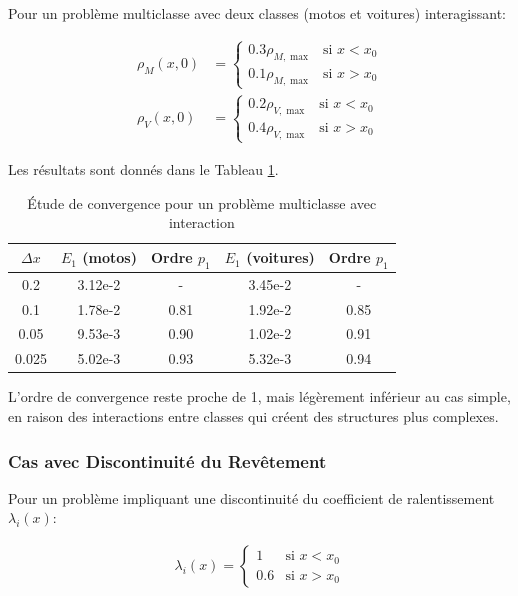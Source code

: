 Pour un problème multiclasse avec deux classes (motos et voitures) interagissant:

\begin{align}
\rho_M(x,0) &= 
\begin{cases}
0.3\rho_{M,\max} & \text{si } x < x_0\\
0.1\rho_{M,\max} & \text{si } x > x_0
\end{cases}\\
\rho_V(x,0) &= 
\begin{cases}
0.2\rho_{V,\max} & \text{si } x < x_0\\
0.4\rho_{V,\max} & \text{si } x > x_0
\end{cases}
\end{align}

Les résultats sont donnés dans le Tableau \ref{tab:conv_multiclasse}.

\begin{table}[htbp]
\centering
\caption{Étude de convergence pour un problème multiclasse avec interaction}
\label{tab:conv_multiclasse}
\begin{tabular}{ccccc}
\toprule
$\Delta x$ & $E_1$ (motos) & Ordre $p_1$ & $E_1$ (voitures) & Ordre $p_1$ \\
\midrule
0.2 & 3.12e-2 & - & 3.45e-2 & - \\
0.1 & 1.78e-2 & 0.81 & 1.92e-2 & 0.85 \\
0.05 & 9.53e-3 & 0.90 & 1.02e-2 & 0.91 \\
0.025 & 5.02e-3 & 0.93 & 5.32e-3 & 0.94 \\
\bottomrule
\end{tabular}
\end{table}

L'ordre de convergence reste proche de 1, mais légèrement inférieur au cas simple, en raison des interactions entre classes qui créent des structures plus complexes.

\subsubsection{Cas avec Discontinuité du Revêtement}
\label{subsubsec:discontinuite_revetement}

Pour un problème impliquant une discontinuité du coefficient de ralentissement $\lambda_i(x)$:

\begin{align}
\lambda_i(x) = 
\begin{cases}
1 & \text{si } x < x_0\\
0.6 & \text{si } x > x_0
\end{cases}
\end{align}

